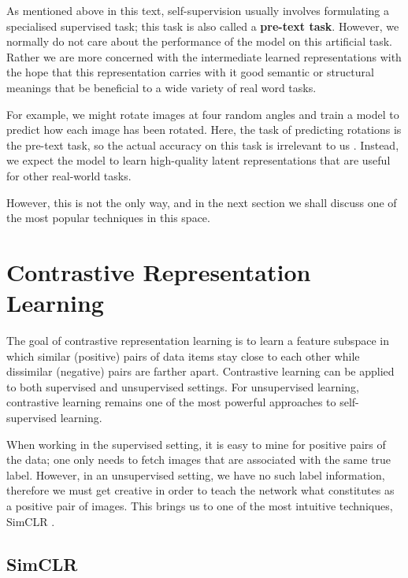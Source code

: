 As mentioned above in this text, self-supervision usually involves formulating a specialised supervised task; this task is also called a \textbf{pre-text task}. However, we normally do not care about the performance of the model on this artificial task. Rather we are more concerned with the intermediate learned representations with the hope that this representation carries with it good semantic or structural meanings that be beneficial to a wide variety of real word tasks.

For example, we might rotate images at four random angles and train a model to predict how each image has been rotated. Here, the task of predicting rotations is the pre-text task, so the actual accuracy on this task is irrelevant to us \parencite{gidaris2018unsupervised}. Instead, we expect the model to learn high-quality latent representations that are useful for other real-world tasks.

However, this is not the only way, and in the next section we shall discuss one of the most popular techniques in this space.

\section{Contrastive Representation Learning}\label{sec:contrastive-learning}
The goal of contrastive representation learning is to learn a feature subspace in which similar (positive) pairs of data items stay close to each other while dissimilar (negative) pairs are farther apart. Contrastive learning can be applied to both supervised and unsupervised settings. For unsupervised learning, contrastive learning remains one of the most powerful approaches to self-supervised learning.

When working in the supervised setting, it is easy to mine for positive pairs of the data; one only needs to fetch images that are associated with the same true label. However, in an unsupervised setting, we have no such label information, therefore we must get creative in order to teach the network what constitutes as a positive pair of images. This brings us to one of the most intuitive techniques, SimCLR \parencite{chen2020simple}.

\subsection{SimCLR} \label{ssec:simclr}

